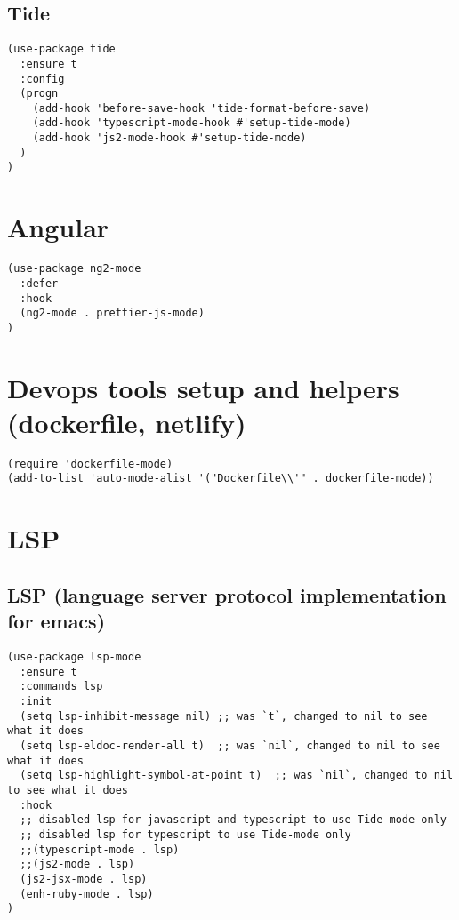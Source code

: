 \documentclass[11pt]{article}
\begin{document}
\subsection*{Tide}
\label{sec:org9c11231}
\begin{verbatim}
(use-package tide
  :ensure t
  :config
  (progn
    (add-hook 'before-save-hook 'tide-format-before-save)
    (add-hook 'typescript-mode-hook #'setup-tide-mode)
    (add-hook 'js2-mode-hook #'setup-tide-mode)
  )
)

\end{verbatim}


\section*{Angular}
\label{sec:orgf1cdad7}
\begin{verbatim}
(use-package ng2-mode
  :defer
  :hook
  (ng2-mode . prettier-js-mode)
)
\end{verbatim}
\section*{Devops tools setup and helpers (dockerfile, netlify)}
\label{sec:org1e5cbb4}

\begin{verbatim}
(require 'dockerfile-mode)
(add-to-list 'auto-mode-alist '("Dockerfile\\'" . dockerfile-mode))
\end{verbatim}


\section*{LSP}
\label{sec:org960345c}

\subsection*{LSP (language server protocol implementation for emacs)}
\label{sec:org5cfed66}

\begin{verbatim}
(use-package lsp-mode
  :ensure t
  :commands lsp
  :init
  (setq lsp-inhibit-message nil) ;; was `t`, changed to nil to see what it does
  (setq lsp-eldoc-render-all t)  ;; was `nil`, changed to nil to see what it does
  (setq lsp-highlight-symbol-at-point t)  ;; was `nil`, changed to nil to see what it does
  :hook
  ;; disabled lsp for javascript and typescript to use Tide-mode only
  ;; disabled lsp for typescript to use Tide-mode only
  ;;(typescript-mode . lsp)
  ;;(js2-mode . lsp)
  (js2-jsx-mode . lsp)
  (enh-ruby-mode . lsp)
)

\end{verbatim}
\end{document}
